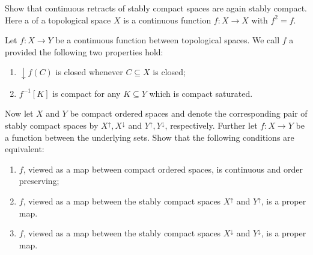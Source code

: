 \begin{exercise}\label{exer:SCSretracts}
Show that continuous retracts of stably compact spaces are again stably compact. Here a  of a topological space $X$ is a continuous function $f\colon X\to X$ with $f^2=f$.
\end{exercise}

\begin{exercise}\label{exer:propermaps}
Let $f\colon X\to Y$ be a continuous function between topological spaces. We call $f$ a  provided the following two properties hold:
\begin{enumerate}
\item  ${\downarrow}f(C)$ is closed whenever $C\subseteq X$ is closed;
\item $f^{-1}[K]$ is compact for any $K\subseteq Y$ which is compact saturated.
\end{enumerate}
Now let $X$ and $Y$ be compact ordered spaces and denote the corresponding pair of stably compact spaces by $X^{\uparrow}, X^{\downarrow}$ and $Y^{\uparrow}, Y^{\downarrow}$, respectively. Further let  $f\colon X\to Y$ be a function between the underlying sets. Show that the following conditions are equivalent:
\begin{enumerate}[label=(\roman*)]
\item $f$, viewed as a map between compact ordered spaces, is continuous and order preserving;
\item $f$, viewed as a map between the stably compact spaces $X^{\uparrow}$ and $Y^{\uparrow}$, is a proper map.
\item $f$, viewed as a map between the stably compact spaces $X^{\downarrow}$ and $Y^{\downarrow}$, is a proper map.
 \end{enumerate}
\end{exercise}

\theendnotes
\setcounter{endnote}{0}

